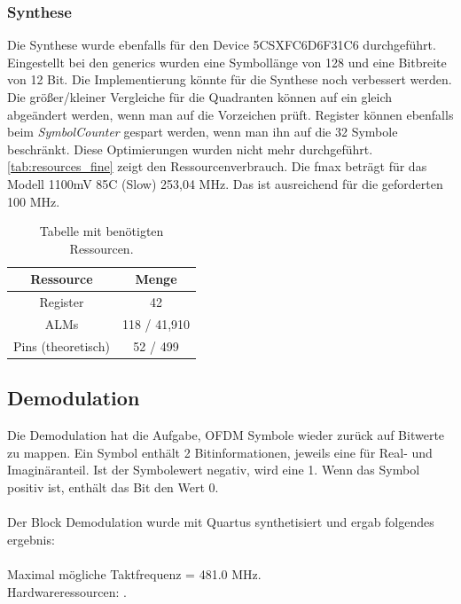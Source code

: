 \subsubsection{Synthese}
Die Synthese wurde ebenfalls für den Device 5CSXFC6D6F31C6 durchgeführt. Eingestellt bei den generics wurden eine Symbollänge von 128 und eine Bitbreite von 12 Bit. Die Implementierung könnte für die Synthese noch verbessert werden. Die größer/kleiner Vergleiche für die Quadranten können auf ein gleich abgeändert werden, wenn man auf die Vorzeichen prüft. Register können ebenfalls beim \textit{SymbolCounter} gespart werden, wenn man ihn auf die 32 Symbole beschränkt. Diese Optimierungen wurden nicht mehr durchgeführt. \autoref{tab:resources_fine} zeigt den Ressourcenverbrauch. Die fmax beträgt für das Modell 1100mV 85C (Slow) 253,04 MHz. Das ist ausreichend für die geforderten 100 MHz.

\begin{table}[H]
	\centering
	\begin{tabular}{|c|c|}
		\hline
		\textbf{Ressource} & \textbf{Menge} \\ \hline
		Register & 42 \\ \hline
		ALMs & 118 / 41,910 \\ \hline
		Pins (theoretisch) & 52 / 499 \\ \hline
	\end{tabular}
	\caption{Tabelle mit benötigten Ressourcen.}
	\label{tab:resources_fine}
\end{table}

\subsection{Demodulation}
Die Demodulation hat die Aufgabe, OFDM Symbole wieder zurück auf Bitwerte zu mappen. Ein Symbol enthält 2 Bitinformationen, jeweils eine für Real- und Imaginäranteil. Ist der Symbolewert negativ, wird eine 1. Wenn das Symbol positiv ist, enthält das Bit den Wert 0.\\
\\
Der Block Demodulation wurde mit Quartus synthetisiert und ergab folgendes ergebnis:\\
\\
Maximal mögliche Taktfrequenz = 481.0 MHz.\\
Hardwareressourcen:
.	









